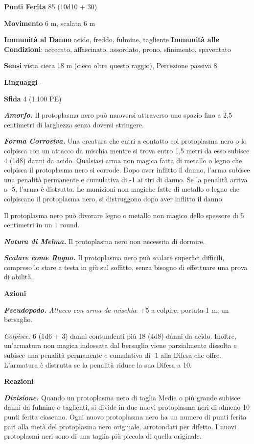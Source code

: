 \begin{multicols}{2}
\textbf{Punti Ferita} 85 (10d10 + 30)

\textbf{Movimento} 6 m, scalata 6 m

\textbf{Immunità al Danno} acido, freddo, fulmine, tagliente
\textbf{Immunità alle Condizioni}: accecato, affascinato, assordato,
prono, sfinimento, spaventato

\textbf{Sensi} vista cieca 18 m (cieco oltre questo raggio), Percezione
passiva 8

\textbf{Linguaggi} -

\textbf{Sfida} 4 (1.100 PE)\smallskip

\emph{\textbf{Amorfo.}} Il protoplasma nero può muoversi attraverso uno
spazio fino a 2,5 centimetri di larghezza senza doversi stringere.

\emph{\textbf{Forma Corrosiva.}} Una creatura che entri a contatto col
protoplasma nero o lo colpisca con un attacco da mischia mentre si trova
entro 1,5 metri da esso subisce 4 (1d8) danni da acido. Qualsiasi arma
non magica fatta di metallo o legno che colpisca il protoplasma nero si
corrode. Dopo aver inflitto il danno, l'arma subisce una penalità
permanente e cumulativa di -1 ai tiri di danno. Se la penalità arriva a
-5, l'arma è distrutta. Le munizioni non magiche fatte di metallo o
legno che colpiscano il protoplasma nero, si distruggono dopo aver
inflitto il danno.

Il protoplasma nero può divorare legno o metallo non magico dello
spessore di 5 centimetri in un 1 round.

\emph{\textbf{Natura di Melma.}} Il protoplasma nero non necessita di
dormire.

\emph{\textbf{Scalare come Ragno.}} Il protoplasma nero può scalare
superfici difficili, compreso lo stare a testa in giù sul soffitto,
senza bisogno di effettuare una prova di abilità.

\smallskip\textbf{Azioni}

\emph{\textbf{Pseudopodo.} Attacco con arma da mischia}: +5 a colpire,
portata 1 m, un bersaglio.

\emph{Colpisce:} 6 (1d6 + 3) danni contundenti più 18 (4d8) danni da
acido. Inoltre, un'armatura non magica indossata dal bersaglio viene
parzialmente dissolta e subisce una penalità permanente e cumulativa di
-1 alla Difesa che offre. L'armatura è distrutta se la penalità riduce la
sua Difesa a 10.

\textbf{Reazioni}

\emph{\textbf{Divisione.}} Quando un protoplasma nero di taglia Media o
più grande subisce danni da fulmine o taglienti, si divide in due nuovi
protoplasma neri di almeno 10 punti ferita ciascuno. Ogni nuovo
protoplasma nero ha un numero di punti ferita pari alla metà del
protoplasma nero originale, arrotondati per difetto. I nuovi protoplasmi
neri sono di una taglia più piccola di quella originale.


\end{multicols}
